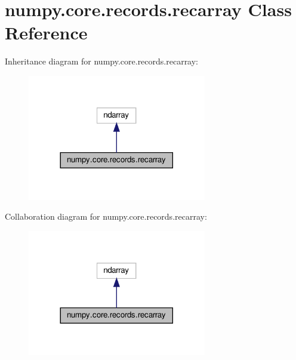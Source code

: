 \hypertarget{classnumpy_1_1core_1_1records_1_1recarray}{}\section{numpy.\+core.\+records.\+recarray Class Reference}
\label{classnumpy_1_1core_1_1records_1_1recarray}


Inheritance diagram for numpy.\+core.\+records.\+recarray\+:
\nopagebreak
\begin{figure}[H]
\begin{center}
\leavevmode
\includegraphics[width=221pt]{classnumpy_1_1core_1_1records_1_1recarray__inherit__graph}
\end{center}
\end{figure}


Collaboration diagram for numpy.\+core.\+records.\+recarray\+:
\nopagebreak
\begin{figure}[H]
\begin{center}
\leavevmode
\includegraphics[width=221pt]{classnumpy_1_1core_1_1records_1_1recarray__coll__graph}
\end{center}
\end{figure}
